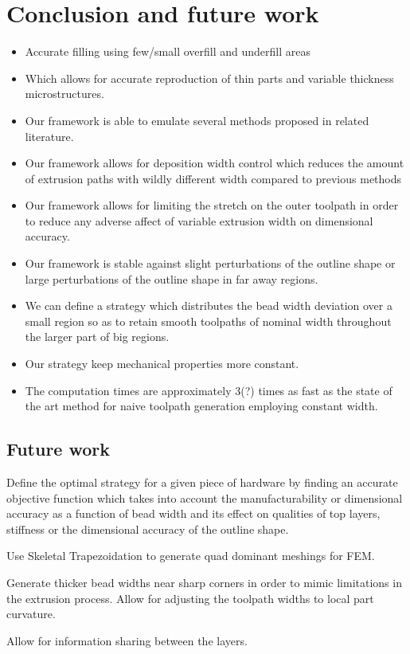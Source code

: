 \section{Conclusion and future work}

\begin{itemize}
\item Accurate filling using few/small overfill and underfill areas
\item Which allows for accurate reproduction of thin parts and variable thickness microstructures.
\item Our framework is able to emulate several methods proposed in related literature.
\item Our framework allows for deposition width control which reduces the amount of extrusion paths with wildly different width compared to previous methods
\item Our framework allows for limiting the stretch on the outer toolpath in order to reduce any adverse affect of variable extrusion width on dimensional accuracy.
\item Our framework is stable against slight perturbations of the outline shape or large perturbations of the outline shape in far away regions.
\item We can define a strategy which distributes the bead width deviation over a small region so as to retain smooth toolpaths of nominal width throughout the larger part of big regions.
\item Our strategy keep mechanical properties more constant.
\item The computation times are approximately 3(?) times as fast as the state of the art method for naive toolpath generation employing constant width.
\end{itemize}



\subsection{Future work}
Define the optimal strategy for a given piece of hardware by finding an accurate objective function which takes into account the manufacturability or dimensional accuracy as a function of bead width and its effect on qualities of top layers, stiffness or the dimensional accuracy of the outline shape.

Use Skeletal Trapezoidation to generate quad dominant meshings for FEM.

Generate thicker bead widths near sharp corners in order to mimic limitations in the extrusion process.
Allow for adjusting the toolpath widths to local part curvature.

Allow for information sharing between the layers.